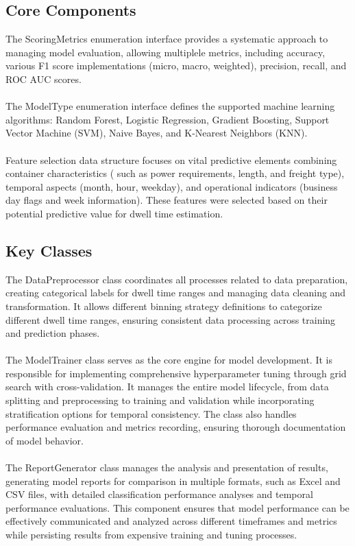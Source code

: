 		\subsection{Core Components}
			The ScoringMetrics enumeration interface provides a systematic approach to managing model evaluation,
			allowing multiplele metrics, including accuracy, various F1 score implementations (micro, macro, weighted),
			precision, recall, and ROC AUC scores.
			\\
			\\
			The ModelType enumeration interface defines the supported machine learning algorithms: Random Forest,
			Logistic Regression, Gradient Boosting, Support Vector Machine (SVM), Naive Bayes, and K-Nearest
			Neighbors (KNN).
			\\
			\\
			Feature selection data structure focuses on vital predictive elements combining container characteristics (
			such as power requirements, length, and freight type), temporal aspects (month, hour, weekday), and
			operational indicators (business day flags and week information). These features were selected based on
			their potential predictive value for dwell time estimation.

		\subsection{Key Classes}
			The DataPreprocessor class coordinates all processes related to data preparation, creating categorical
			labels for dwell time ranges and managing data cleaning and transformation. It allows different binning
			strategy definitions to categorize different dwell time ranges, ensuring consistent data processing across
			training and prediction phases.
			\\
			\\
			The ModelTrainer class serves as the core engine for model development. It is responsible for implementing
			comprehensive hyperparameter tuning through grid search with cross-validation. It manages the entire model
			lifecycle, from data splitting and preprocessing to training and validation while incorporating
			stratification options for temporal consistency. The class also handles performance evaluation and metrics
			recording, ensuring thorough documentation of model behavior.
			\\
			\\
			The ReportGenerator class manages the analysis and presentation of results, generating model reports for
			comparison in multiple formats, such as Excel and CSV files, with detailed classification performance
			analyses and temporal performance evaluations.
			This component ensures that model performance can be effectively communicated and analyzed across different
			timeframes and metrics while persisting results from expensive training and tuning processes.

